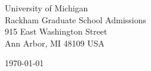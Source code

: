 \begin{minipage}{0.49\textwidth}
\begin{flushleft}
\noindent
University of Michigan \\
Rackham Graduate School Admissions\\
915 East Washington Street \\
Ann Arbor, MI 48109 USA \\

\end{flushleft}
\end{minipage}
\begin{minipage}{0.47\textwidth}
\begin{flushright}
\today
\end{flushright}
\end{minipage} \\

\newcommand{\univ}{University of Michigan}
\newcommand{\univshort}{UMich}
\newcommand{\degree}{Ph.D. degree in Computer Science}
\newcommand{\dept}{Computer Science}



